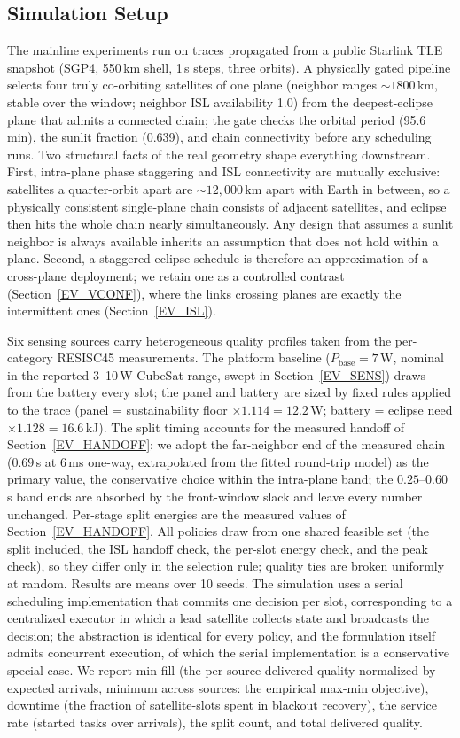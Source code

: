 \subsection{Simulation Setup}\label{EV_SETUP}
The mainline experiments run on traces propagated from a public Starlink TLE
snapshot (SGP4, 550\,km shell, 1\,s steps, three orbits). A physically gated
pipeline selects four truly co-orbiting satellites of one plane (neighbor
ranges ${\sim}1800$\,km, stable over the window; neighbor ISL availability
1.0) from the deepest-eclipse plane that admits a connected chain; the gate
checks the orbital period (95.6\,min), the sunlit fraction (0.639), and chain
connectivity before any scheduling runs. Two structural facts of the real
geometry shape everything downstream. First, intra-plane phase staggering and
ISL connectivity are mutually exclusive: satellites a quarter-orbit apart are
${\sim}12{,}000$\,km apart with Earth in between, so a physically consistent
single-plane chain consists of adjacent satellites, and eclipse then hits the
whole chain nearly simultaneously. Any design that assumes a sunlit neighbor
is always available inherits an assumption that does not hold within a plane.
Second, a staggered-eclipse schedule is therefore an approximation of a
cross-plane deployment; we retain one as a controlled contrast
(Section~\ref{EV_VCONF}), where the links crossing planes are exactly the
intermittent ones (Section~\ref{EV_ISL}).

Six sensing sources carry heterogeneous quality profiles taken from the
per-category RESISC45 measurements. The platform baseline
($P_{\text{base}}{=}7$\,W, nominal in the reported 3--10\,W CubeSat range,
swept in Section~\ref{EV_SENS}) draws from the battery every slot; the panel
and battery are sized by fixed rules applied to the trace (panel =
sustainability floor $\times1.114 = 12.2$\,W; battery = eclipse need
$\times1.128 = 16.6$\,kJ). The split timing accounts for the measured handoff
of Section~\ref{EV_HANDOFF}: we adopt the far-neighbor end of the measured
chain ($0.69$\,s at 6\,ms one-way, extrapolated from the fitted round-trip
model) as the primary value, the conservative choice within the intra-plane
band; the $0.25$--$0.60$\,s band ends are absorbed by the front-window slack
and leave every number unchanged. Per-stage split energies are the measured
values of Section~\ref{EV_HANDOFF}. All policies draw from one shared feasible
set (the split included, the ISL handoff check, the per-slot energy check, and
the peak check), so they differ only in the selection rule; quality ties are
broken uniformly at random. Results are means over 10 seeds. The simulation
uses a serial scheduling implementation that commits one decision per slot,
corresponding to a centralized executor in which a lead satellite collects
state and broadcasts the decision; the abstraction is identical for every
policy, and the formulation itself admits concurrent execution, of which the
serial implementation is a conservative special case. We report min-fill (the
per-source delivered quality normalized by expected arrivals, minimum across
sources: the empirical max-min objective), downtime (the fraction of
satellite-slots spent in blackout recovery), the service rate (started tasks
over arrivals), the split count, and total delivered quality.

